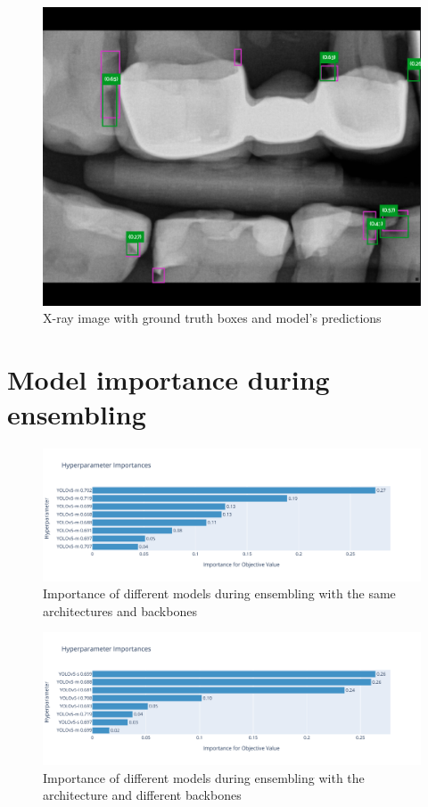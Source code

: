 \begin{figure}
    \includegraphics[width=0.9\linewidth]{images/rest2.png}
    \caption{X-ray image with ground truth boxes and model's predictions}
    \label{fig:pred_img4}
\end{figure}

\chapter{Model importance during ensembling}

\begin{figure}
    \centering
    \includegraphics[width=\linewidth]{images/ensemble_yolo_importance.pdf}
    \caption{Importance of different models during ensembling with the same architectures and backbones}
\end{figure}

\begin{figure}
    \centering
    \includegraphics[width=\linewidth]{images/ensemble_yolo_mix_importance.pdf}
    \caption{Importance of different models during ensembling with the architecture and different backbones}
\end{figure}

